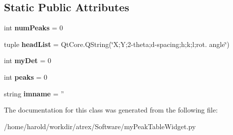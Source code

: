 \subsection*{Static Public Attributes}
\begin{DoxyCompactItemize}
\item 
\hypertarget{classmyPeakTableWidget_1_1myPeakTableWidget_a8e630a6f15d224300abc621b8bac8e23}{int {\bfseries num\-Peaks} = 0}\label{classmyPeakTableWidget_1_1myPeakTableWidget_a8e630a6f15d224300abc621b8bac8e23}

\item 
\hypertarget{classmyPeakTableWidget_1_1myPeakTableWidget_a6b0c16aabbedcc000d20542e5d4b3e08}{tuple {\bfseries head\-List} = Qt\-Core.\-Q\-String(\char`\"{}X;Y;2-\/theta;d-\/spacing;h;k;l;rot. angle\char`\"{})}\label{classmyPeakTableWidget_1_1myPeakTableWidget_a6b0c16aabbedcc000d20542e5d4b3e08}

\item 
\hypertarget{classmyPeakTableWidget_1_1myPeakTableWidget_a7be636c918a7d4e642015b4531795477}{int {\bfseries my\-Det} = 0}\label{classmyPeakTableWidget_1_1myPeakTableWidget_a7be636c918a7d4e642015b4531795477}

\item 
\hypertarget{classmyPeakTableWidget_1_1myPeakTableWidget_a00a3801ee16f8bb1b140b254793e098c}{int {\bfseries peaks} = 0}\label{classmyPeakTableWidget_1_1myPeakTableWidget_a00a3801ee16f8bb1b140b254793e098c}

\item 
\hypertarget{classmyPeakTableWidget_1_1myPeakTableWidget_ae072cce7f45a7c9a7c4a4d6ea9887593}{string {\bfseries imname} = ''}\label{classmyPeakTableWidget_1_1myPeakTableWidget_ae072cce7f45a7c9a7c4a4d6ea9887593}

\end{DoxyCompactItemize}


The documentation for this class was generated from the following file\-:\begin{DoxyCompactItemize}
\item 
/home/harold/workdir/atrex/\-Software/my\-Peak\-Table\-Widget.\-py\end{DoxyCompactItemize}
